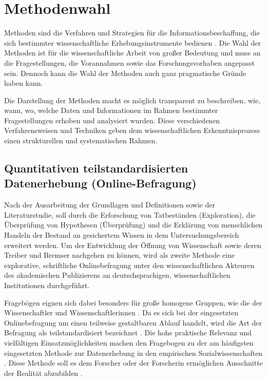 \section{Methodenwahl}

Methoden sind die Verfahren und Strategien für die Informationsbeschaffung, die sich bestimmter wissenschaftliche Erhebungsinstrumente bedienen \cite[:309]{kromrey2013empirische}. Die Wahl der Methoden ist für die wissenschaftliche Arbeit von großer Bedeutung und muss an die Fragestellungen, die Vorannahmen sowie das Forschungsvorhaben angepasst sein. Dennoch kann die Wahl der Methoden auch ganz pragmatische Gründe haben kann.

Die Darstellung der Methoden macht es möglich transparent zu beschreiben, wie, wann, wo, welche Daten und Informationen im Rahmen bestimmter Fragestellungen erhoben und analysiert wurden. Diese verschiedenen Verfahrensweisen und Techniken geben dem wissenschaftlichen Erkenntnisprozess einen strukturellen und systematischen Rahmen.

\subsection{Quantitativen teilstandardisierten Datenerhebung (Online-Befragung)}

Nach der Ausarbeitung der Grundlagen und Definitionen sowie der Literaturstudie, soll durch die Erforschung von Tatbeständen (Exploration), die Überprüfung von Hypothesen (Überprüfung) \cite{raab_2012_fragebogen} und die Erklärung von menschlichen Handeln \cite{atteslander_2008_methoden} der Bestand an gesichertem Wissen in dem Untersuchungsbereich erweitert \cite{bortz_Doering_2006_fragestellung} werden. Um der Entwicklung der Öffnung von Wissenschaft sowie deren Treiber und Bremser nachgehen zu können, wird als zweite Methode eine explorative, schriftliche Onlinebefragung unter den wissenschaftlichen Akteuren des akademischen Publizierens an deutschsprachigen, wissenschaftlichen Institutionen durchgeführt.

Fragebögen eignen sich dabei besonders für große homogene Gruppen, wie die der Wissenschaftler und Wissenschaftlerinnen \cite{suchen}. Da es sich bei der eingesetzten Onlinebefragung um einen teilweise gestaltbaren Ablauf handelt, wird die Art der Befragung als teilstandardisiert bezeichnet \cite{raab_2012_fragebogen}. Die hohe praktische Relevanz und vielfältigen Einsatzmöglichkeiten machen den Fragebogen zu der am häufigsten eingesetzten Methode zur Datenerhebung in den empirischen Sozialwissenschaften \cite{raab_2012_fragebogen}. Diese Methode soll es dem Forscher oder der Forscherin ermöglichen Ausschnitte der Realität abzubilden \cite{raab_2012_fragebogen}.

